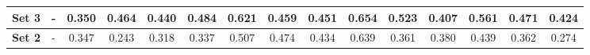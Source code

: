\begin{table}[!ht]
{\begin{tabular}{|c|c|ccc|ccc|ccc|c|c|c|c|}
		\hline
		
		\textbf{Set 3} & - & \multicolumn{1}{c|}{0.350} & \multicolumn{1}{c|}{0.464} & 0.440 & \multicolumn{1}{c|}{0.484} & \multicolumn{1}{c|}{0.621} & 0.459 & \multicolumn{1}{c|}{0.451} & \multicolumn{1}{c|}{0.654} & 0.523 & 0.407 & 0.561 & 0.471 & 0.424 \\
		
		\hline
		\hline
		
		\textbf{Set 2} & - & \multicolumn{1}{c|}{0.347} & \multicolumn{1}{c|}{0.243} & 0.318 & \multicolumn{1}{c|}{0.337} & \multicolumn{1}{c|}{0.507} & 0.474 & \multicolumn{1}{c|}{0.434} & \multicolumn{1}{c|}{0.639} & 0.361 & 0.380 & 0.439 & 0.362 & 0.274 \\ 
		
		\hline
					
	\end{tabular}}
	\label{tab:Experiment1.2Results}
\end{table}

